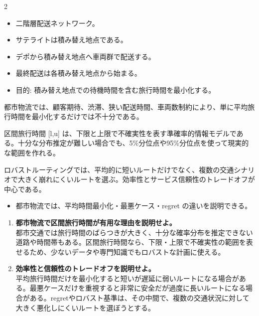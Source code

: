 \clearpage
{}
\begin{multicols}{2}\footnotesize\raggedcolumns
{}
\begin{itemize}
\item 二階層配送ネットワーク。
\item サテライトは積み替え地点である。
\item デポから積み替え地点へ車両群で配送する。
\item 最終配送は各積み替え地点から始まる。
\item 目的: 積み替え地点での待機時間を含む旅行時間を最小化する。
\end{itemize}
都市物流では、顧客期待、渋滞、狭い配送時間、車両数制約により、単に平均旅行時間を最小化するだけでは不十分である。\par

区間旅行時間 [l,u] は、下限と上限で不確実性を表す準確率的情報モデルである。十分な分布推定が難しい場合でも、5\%分位点や95\%分位点を使って現実的な範囲を作れる。\par

ロバストルーティングでは、平均的に短いルートだけでなく、複数の交通シナリオで大きく崩れにくいルートを選ぶ。効率性とサービス信頼性のトレードオフが中心である。\par
{}
\begin{itemize}
\item 都市物流では、平均時間最小化・最悪ケース・regret の違いを説明できる。
\end{itemize}
\begin{enumerate}
\item \textbf{都市物流で区間旅行時間が有用な理由を説明せよ。}\\都市交通では旅行時間のばらつきが大きく、十分な確率分布を推定できない道路や時間帯もある。区間旅行時間なら、下限・上限で不確実性の範囲を表せるため、少ないデータや専門知識でもロバストな計画に使える。
\item \textbf{効率性と信頼性のトレードオフを説明せよ。}\\平均旅行時間だけを最小化すると短いが遅延に弱いルートになる場合がある。最悪ケースだけを重視すると非常に安全だが過度に長いルートになる場合がある。regretやロバスト基準は、その中間で、複数の交通状況に対して大きく悪化しにくいルートを選ぼうとする。
\end{enumerate}
\end{multicols}

